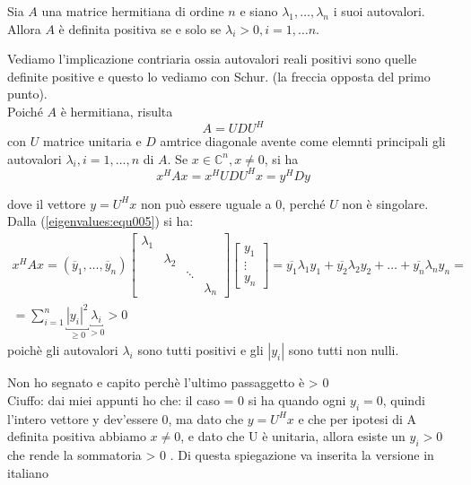 \begin{theo}
\label{eigenvalues:theo006}
 Sia $A$ una matrice hermitiana di ordine $n$ e siano
$\lambda_1, \ldots, \lambda_n$ i suoi autovalori. Allora
$A$ \`e definita positiva se e solo se $\lambda_i > 0, i =1, \ldots n$.
\end{theo}
\begin{thproof}
Vediamo l'implicazione contriaria ossia
autovalori reali positivi sono quelle definite positive
e questo lo vediamo con Schur. (la freccia opposta del primo punto). \\
Poich\'e $A$  \`e hermitiana, risulta
$$ A = UDU^{H}$$ 
con $U$ matrice unitaria e $D$ amtrice diagonale avente come elemnti principali
gli autovalori $\lambda_i, i=1, \ldots,n$ di $A$. Se $x \in \mathbb{C}^{n}, x \neq 0$,
si ha
\begin{equation}
\label{eigenvalues:equ005}
x^{H} A x = x^{H}UDU^{H}x = y^{H}Dy 
\end{equation}

dove il vettore $y = U^{H}x$ non può essere uguale a $0$, perch\'e $U$
non \`e singolare. Dalla (\ref{eigenvalues:equ005}) si ha:
$$ 
\begin{array}{c}
x^{H}Ax = (\overline{y}_1, \ldots, \overline{y}_n)
 \left[
\begin{array}{cccc}
\lambda_1 & & &  \\
& \lambda_2 & &  \\
 & & \ddots &  \\
 & &  & \lambda_n 
\end{array}
\right]
\left[
\begin{array}{c}
y_1 \\
\vdots \\
y_n
\end{array}
\right]
 = \overline{y_{1}}\lambda_1 y_1 + \overline{y_{2}}\lambda_2 y_2 +
   \ldots + \overline{y_{n}}\lambda_n y_n = \\
 = \displaystyle \sum_{i=1}^{n} \underbracket{|y_i|^{2}}_{\geq 0} \underbracket{\lambda_{i}}_{>0}
 > 0
\end{array}
$$
poich\`e gli autovalori $\lambda_i$ sono tutti positivi e gli $|y_i|$
sono tutti non nulli.
\begin{notes} 

 Non ho segnato e capito perch\`e l'ultimo passaggetto \`e > 0 \\
Ciuffo: dai miei appunti ho che:  il caso = 0 si ha quando ogni $y_{i} = 0$,
quindi l'intero vettore y dev'essere 0, 
ma dato che $ y=U^{H}x $ e che per ipotesi di A definita positiva abbiamo
 $ x \neq 0 $, e dato che U \`e unitaria, 
allora esiste un $ y_i > 0 $ che rende la sommatoria > 0 .
Di questa spiegazione va inserita la versione in italiano
\end{notes}
\end{thproof}

